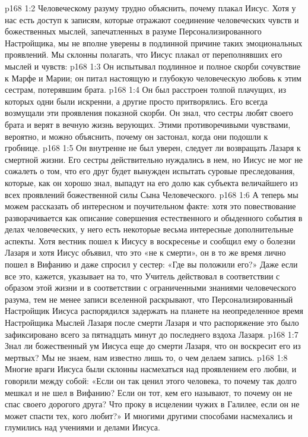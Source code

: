 \vs p168 1:2 \pc Человеческому разуму трудно объяснить, почему плакал Иисус. Хотя у нас есть доступ к записям, которые отражают соединение человеческих чувств и божественных мыслей, запечатленных в разуме Персонализированного Настройщика, мы не вполне уверены в подлинной причине таких эмоциональных проявлений. Мы склонны полагать, что Иисус плакал от переполнявших его мыслей и чувств:
\vs p168 1:3 \bibnobreakspace Он испытывал подлинное и полное скорби сочувствие к Марфе и Марии; он питал настоящую и глубокую человеческую любовь к этим сестрам, потерявшим брата.
\vs p168 1:4 \bibnobreakspace Он был расстроен толпой плачущих, из которых одни были искренни, а другие просто притворялись. Его всегда возмущали эти проявления показной скорби. Он знал, что сестры любят своего брата и верят в вечную жизнь верующих. Этими противоречивыми чувствами, вероятно, и можно объяснить, почему он застонал, когда они подошли к гробнице.
\vs p168 1:5 \bibnobreakspace Он внутренне не был уверен, следует ли возвращать Лазаря к смертной жизни. Его сестры действительно нуждались в нем, но Иисус не мог не сожалеть о том, что его друг будет вынужден испытать суровые преследования, которые, как он хорошо знал, выпадут на его долю как субъекта величайшего из всех проявлений божественной силы Сына Человеческого.
\vs p168 1:6 \pc А теперь мы можем рассказать об интересном и поучительном факте: хотя это повествование разворачивается как описание совершения естественного и обыденного события в делах человеческих, у него есть некоторые весьма интересные дополнительные аспекты. Хотя вестник пошел к Иисусу в воскресенье и сообщил ему о болезни Лазаря и хотя Иисус объявил, что это «не к смерти», он в то же время лично пошел в Вифанию и даже спросил у сестер: «Где вы положили его?» Даже если все это, кажется, указывает на то, что Учитель действовал в соответствии с образом этой жизни и в соответствии с ограниченными знаниями человеческого разума, тем не менее записи вселенной раскрывают, что Персонализированный Настройщик Иисуса распорядился задержать на планете на неопределенное время Настройщика Мыслей Лазаря после смерти Лазаря и что распоряжение это было зафиксировано всего за пятнадцать минут до последнего вздоха Лазаря.
\vs p168 1:7 Знал ли божественный ум Иисуса еще до смерти Лазаря, что он воскресит его из мертвых? Мы не знаем, нам известно лишь то, о чем делаем запись.
\vs p168 1:8 \pc Многие враги Иисуса были склонны насмехаться над проявлением его любви, и говорили между собой: «Если он так ценил этого человека, то почему так долго мешкал и не шел в Вифанию? Если он тот, кем его называют, то почему он не спас своего дорогого друга? Что проку в исцелении чужих в Галилее, если он не может спасти тех, кого любит?» И многими другими способами насмехались и глумились над учениями и делами Иисуса.
